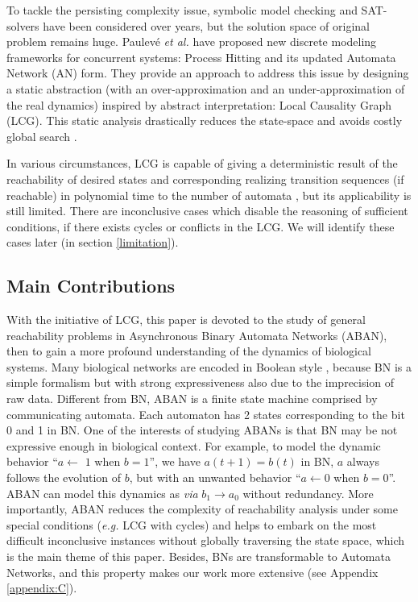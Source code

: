 \documentclass[runningheads]{llncs}
\newcommand{\ac}[3]{$#1\rightarrow#2$}
\begin{document}
To tackle the persisting complexity issue, symbolic model checking \cite{burch1992symbolic} and SAT-solvers \cite{abdulla2000symbolic} have been considered over years, but the solution space of original problem remains huge. Paulev\'e \textit{et al.} \cite{folschette2015,pauleve2011} have proposed new discrete modeling frameworks for concurrent systems: Process Hitting and its updated Automata Network (AN) form. 
They provide an approach to address this issue by designing a static abstraction (with an over-approximation and an under-approximation of the real dynamics) inspired by abstract interpretation: Local Causality Graph (LCG). 
This static analysis drastically reduces the state-space and avoids costly global search \cite{pauleve2012}.

In various circumstances, LCG is capable of giving a deterministic result of the reachability of desired states and corresponding realizing transition sequences (if reachable) in polynomial time to the number of automata \cite{pauleve2016goal}, but its applicability is still limited. 
There are inconclusive cases which disable the reasoning of sufficient conditions, if there exists cycles or conflicts in the LCG.
We will identify these cases later (in section \ref{limitation}).
\subsection*{Main Contributions}
With the initiative of LCG, this paper is devoted to the study of general reachability problems in Asynchronous Binary Automata Networks (ABAN), then to gain a more profound understanding of the dynamics of biological systems. 
Many biological networks are encoded in Boolean style \cite{kauffman1969}, because BN is a simple formalism but with strong expressiveness also due to the imprecision of raw data.
Different from BN, ABAN is a finite state machine comprised by communicating automata.
Each automaton has 2 states corresponding to the bit 0 and 1 in BN. 
One of the interests of studying ABANs is that BN may be not expressive enough in biological context. 
For example, to model the dynamic behavior ``$a\gets$ $1$ when $b=1$'', we have $a(t+1)=b(t)$ in BN, $a$ always follows the evolution of $b$, but with an unwanted behavior ``$a\gets 0$ when $b=0$''.
ABAN can model this dynamics as \textit{via} \ac{b_1}{a_0}{a_1} without redundancy.
More importantly, ABAN reduces the complexity of reachability analysis under some special conditions (\textit{e.g.} LCG with cycles) and helps to embark on the most difficult inconclusive instances without globally traversing the state space, which is the main theme of this paper. 
Besides, BNs are transformable to Automata Networks, and this property makes our work more extensive (see Appendix \ref{appendix:C}).
\end{document}
